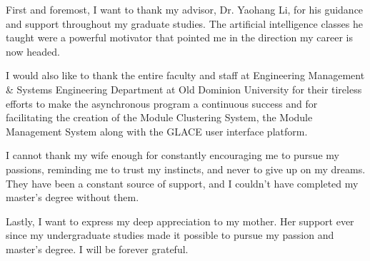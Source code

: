 

First and foremost, I want to thank my advisor, Dr. Yaohang Li, for his guidance and support throughout my graduate studies. The artificial intelligence classes he taught were a powerful motivator that pointed me in the direction my career is now headed. 

I would also like to thank the entire faculty and staff at Engineering Management \& Systems Engineering Department at Old Dominion University for their tireless efforts to make the asynchronous program a continuous success and for facilitating the creation of the Module Clustering System, the Module Management System along with the GLACE user interface platform.

I cannot thank my wife enough for constantly encouraging me to pursue my passions, reminding me to trust my instincts, and never to give up on my dreams. They have been a constant source of support, and I couldn't have completed my master's degree without them.

Lastly, I want to express my deep appreciation to my mother. Her support ever since my undergraduate studies made it possible to pursue my passion and master's degree. I will be forever grateful.
